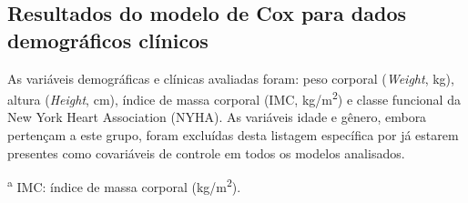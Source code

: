\FloatBarrier

\subsection{Resultados do modelo de Cox para dados demográficos clínicos}

As variáveis demográficas e clínicas avaliadas foram: peso corporal
(\textit{Weight}, kg), altura (\textit{Height}, cm), índice de massa corporal
(IMC, kg/m\textsuperscript{2}) e classe funcional da New York Heart Association
(NYHA). As variáveis idade e gênero, embora pertençam a este grupo, foram
excluídas desta listagem específica por já estarem presentes como covariáveis
de controle em todos os modelos analisados.


\begin{table}[htbp]
	\centering
	\caption{Modelo de Cox com dados clínicos e antropométricos na coorte completa ($n=992$; 205 eventos).}
	\label{tab:cox_clinico_completo}
	\begin{flushleft}
		\footnotesize
		\textsuperscript{a} IMC: índice de massa corporal (kg/m\textsuperscript{2}).
	\end{flushleft}
\end{table}

